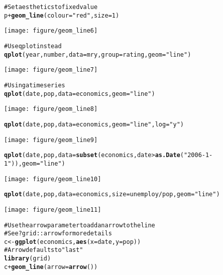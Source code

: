 \documentclass[a4paper,titlepage]{tufte-handout}\usepackage{graphicx, color}
\makeatletter
\def\maxwidth{ %
  \ifdim\Gin@nat@width>\linewidth
    \linewidth
  \else
    \Gin@nat@width
  \fi
}
\newcommand{\hlfunctioncall}[1]{\textcolor[rgb]{0.501960784313725,0,0.329411764705882}{\textbf{#1}}}%
\newcommand{\hlstring}[1]{\textcolor[rgb]{0.6,0.6,1}{#1}}%
\newcommand{\hlcomment}[1]{\textcolor[rgb]{0.180392156862745,0.6,0.341176470588235}{#1}}%
\newenvironment{kframe}{%
 \def\at@end@of@kframe{}%
 \ifinner\ifhmode%
  \def\at@end@of@kframe{\end{minipage}}%
  \begin{minipage}{\columnwidth}%
 \fi\fi%
 \def\FrameCommand##1{\hskip\@totalleftmargin \hskip-\fboxsep
 \colorbox{shadecolor}{##1}\hskip-\fboxsep
     \hskip-\linewidth \hskip-\@totalleftmargin \hskip\columnwidth}%
 \MakeFramed {\advance\hsize-\width
   \@totalleftmargin\z@ \linewidth\hsize
   \@setminipage}}%
 {\par\unskip\endMakeFramed%
 \at@end@of@kframe}
\newenvironment{knitrout}{}{} %
\makeatother
\begin{document}
\begin{knitrout}
\begin{kframe}
\begin{alltt}
\hlcomment{# Set aesthetics to fixed value}
p + \hlfunctioncall{geom_line}(colour = \hlstring{"red"}, size = 1)
\end{alltt}
\end{kframe}\texttt{[image: figure/geom\_line6]} \begin{kframe}\begin{alltt}
\hlcomment{# Use qplot instead}
\hlfunctioncall{qplot}(year, number, data=mry, group=rating, geom=\hlstring{"line"})
\end{alltt}
\end{kframe}\texttt{[image: figure/geom\_line7]} \begin{kframe}\begin{alltt}
\hlcomment{# Using a time series}
\hlfunctioncall{qplot}(date, pop, data=economics, geom=\hlstring{"line"})
\end{alltt}
\end{kframe}\texttt{[image: figure/geom\_line8]} \begin{kframe}\begin{alltt}
\hlfunctioncall{qplot}(date, pop, data=economics, geom=\hlstring{"line"}, log=\hlstring{"y"})
\end{alltt}
\end{kframe}\texttt{[image: figure/geom\_line9]} \begin{kframe}\begin{alltt}
\hlfunctioncall{qplot}(date, pop, data=\hlfunctioncall{subset}(economics, date > \hlfunctioncall{as.Date}(\hlstring{"2006-1-1"})), geom=\hlstring{"line"})
\end{alltt}
\end{kframe}\texttt{[image: figure/geom\_line10]} \begin{kframe}\begin{alltt}
\hlfunctioncall{qplot}(date, pop, data=economics, size=unemploy/pop, geom=\hlstring{"line"})
\end{alltt}
\end{kframe}\texttt{[image: figure/geom\_line11]} \begin{kframe}\begin{alltt}
\hlcomment{# Use the arrow parameter to add an arrow to the line}
\hlcomment{# See ?grid::arrow for more details}
c <- \hlfunctioncall{ggplot}(economics, \hlfunctioncall{aes}(x = date, y = pop))
# Arrow defaults to \hlstring{"last"}
\hlfunctioncall{library}(grid)
c + \hlfunctioncall{geom_line}(arrow = \hlfunctioncall{arrow}())

\end{alltt}
\end{kframe}
\end{knitrout}
\end{document}
